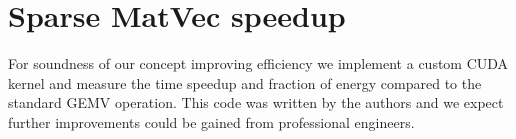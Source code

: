 \documentclass{article}
\theoremstyle{plain}
\theoremstyle{definition}
\theoremstyle{remark}
\begin{document}

\clearpage
\section{Sparse MatVec speedup}\label{app:sparse_matvec}

For soundness of our concept improving efficiency we implement a custom CUDA kernel and measure the time speedup and fraction of energy compared to the standard GEMV operation. This code was written by the authors and we expect further improvements could be gained from professional engineers.
\end{document}
